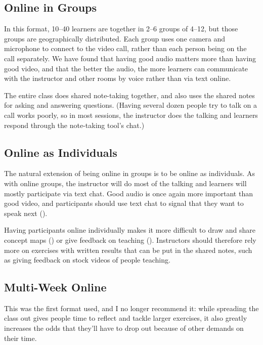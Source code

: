 \subsection*{Online in Groups}

In this format, 10--40 learners are together in 2--6 groups of 4--12,
but those groups are geographically distributed.  Each group uses one
camera and microphone to connect to the video call, rather than each
person being on the call separately. We have found that having good
audio matters more than having good video, and that the better the
audio, the more learners can communicate with the instructor and other
rooms by voice rather than via text online.

The entire class does shared note-taking together, and also uses the
shared notes for asking and answering questions.  (Having several
dozen people try to talk on a call works poorly, so in most sessions,
the instructor does the talking and learners respond through the
note-taking tool's chat.)

\subsection*{Online as Individuals}

The natural extension of being online in groups is to be online as
individuals.  As with online groups, the instructor will do most of
the talking and learners will mostly participate via text chat.  Good
audio is once again more important than good video, and participants
should use text chat to signal that they want to speak next
().

Having participants online individually makes it more difficult to
draw and share concept maps () or give
feedback on teaching ().  Instructors
should therefore rely more on exercises with written results that can
be put in the shared notes, such as giving feedback on stock videos of
people teaching.

\subsection*{Multi-Week Online}

This was the first format used, and I no longer recommend it: while
spreading the class out gives people time to reflect and tackle larger
exercises, it also greatly increases the odds that they'll have to
drop out because of other demands on their time.

